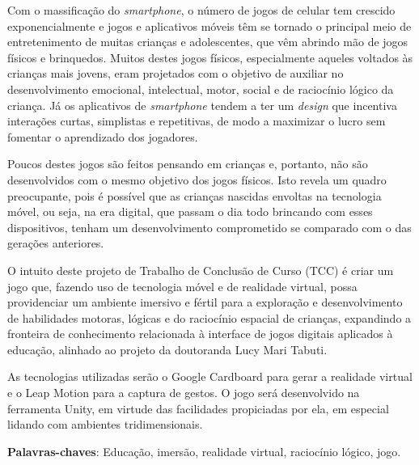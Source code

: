 \begin{resumo}
\begin{comment}
O resumo deve ser redigido, preferencialmente, na terceira pessoa do singular com verbo na voz ativa, em parágrafo único, e conter no máximo 500 palavras.
\end{comment}


Com o massificação do \textit{smartphone}, o número de jogos de celular tem crescido exponencialmente e jogos e aplicativos móveis têm se tornado o principal meio de entretenimento de muitas crianças e adolescentes, que vêm abrindo mão de jogos físicos e brinquedos. Muitos destes jogos físicos, especialmente aqueles voltados às crianças mais jovens, eram projetados com o objetivo de auxiliar no desenvolvimento emocional, intelectual, motor, social e de raciocínio lógico da criança. Já os aplicativos de \textit{smartphone} tendem a ter um \textit{design} que incentiva interações curtas, simplistas e repetitivas, de modo a maximizar o lucro sem fomentar o aprendizado dos jogadores.

Poucos destes jogos são feitos pensando em crianças e, portanto, não são desenvolvidos com o mesmo objetivo dos jogos físicos. Isto revela um quadro preocupante, pois é possível que as crianças nascidas envoltas na tecnologia móvel, ou seja, na era digital, que passam o dia todo brincando com esses dispositivos, tenham um desenvolvimento comprometido se comparado com o das gerações anteriores.

O intuito deste projeto de Trabalho de Conclusão de Curso (TCC) é criar um jogo que, fazendo uso de tecnologia móvel e de realidade virtual, possa providenciar um ambiente imersivo e fértil para a exploração e desenvolvimento de habilidades motoras, lógicas e do raciocínio espacial de crianças, expandindo a fronteira de conhecimento relacionada à interface de jogos digitais aplicados à educação, alinhado ao projeto da doutoranda Lucy Mari Tabuti.

As tecnologias utilizadas serão o Google Cardboard para gerar a realidade virtual e o Leap Motion para a captura de gestos. O jogo será desenvolvido na ferramenta Unity, em virtude das facilidades propiciadas por ela, em especial lidando com ambientes tridimensionais.

 \vspace{\onelineskip}

 \noindent
 \textbf{Palavras-chaves}: Educação, imersão, realidade virtual, raciocínio lógico, jogo.
\end{resumo}
 
